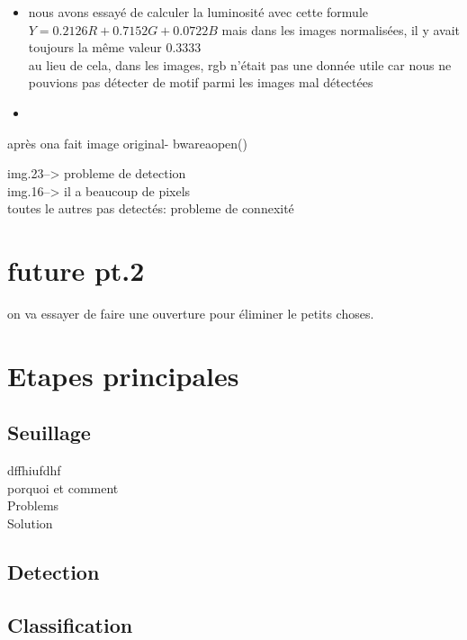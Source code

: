 \documentclass[11pt, french]{article}
\begin{document}
\begin{itemize}
\item nous avons essayé de calculer la luminosité avec cette formule $ Y=0.2126R+0.7152G+0.0722B$ 
mais dans les images normalisées, il y avait toujours la même valeur $0.3333$\\

au lieu de cela, dans les images, rgb n'était pas une donnée utile car nous ne pouvions pas détecter de motif parmi les images mal détectées

\item 

\end{itemize}

après ona fait image original- bwareaopen()

img.23--> probleme de detection\\
img.16--> il a beaucoup de pixels\\
toutes le autres pas detectés: probleme de connexité

\section{future pt.2}

on va essayer de faire une ouverture pour éliminer le petits choses.






\section{Etapes principales}

\subsection{Seuillage}
dffhiufdhf\\

porquoi et comment\\

Problems\\

Solution\\


\subsection{Detection}

\subsection{Classification}
\end{document}
